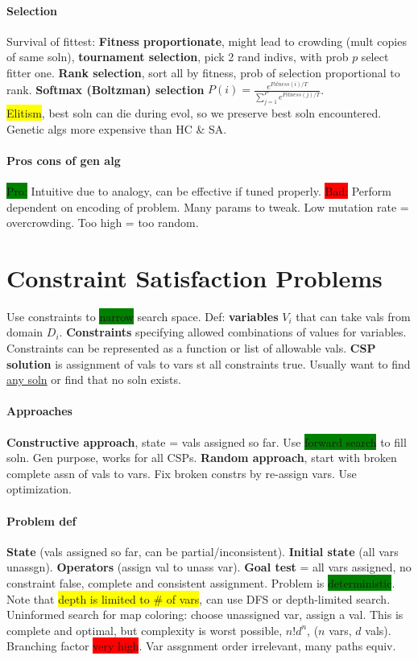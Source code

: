 \paragraph{Selection} Survival of fittest: \textbf{Fitness
  proportionate}, might lead to crowding (mult copies of same soln),
\textbf{tournament selection}, pick 2 rand indivs, with prob $p$
select fitter one. \textbf{Rank selection}, sort all by fitness, prob
of selection proportional to rank. \textbf{Softmax (Boltzman)
  selection}
$P(i)=\frac{e^{Fitness(i)/T}}{\sum_{j=1}^{P}e^{Fitness(j)/T}}$.
\\ \colorbox{yellow}{Elitism}, best soln can die during evol, so we
preserve best soln encountered. Genetic algs more expensive than HC \&
SA.
\paragraph{Pros cons of gen alg} \colorbox{green}{Pro:} Intuitive due to analogy, can be
effective if tuned properly. \colorbox{red}{Bad:} Perform dependent on
encoding of problem. Many params to tweak. Low mutation rate =
overcrowding. Too high = too random.
\color[HTML]{ff7373}
\section{Constraint Satisfaction Problems} Use constraints to
\colorbox{green}{narrow} search space. Def: \textbf{variables} $V_i$
that can take vals from domain $D_i$. \textbf{Constraints} specifying
allowed combinations of values for variables. Constraints can be
represented as a function or list of allowable vals. \textbf{CSP
  solution} is assignment of vals to vars st all constraints
true. Usually want to find \underline{any soln} or find that no soln
exists.
\paragraph{Approaches}
\textbf{Constructive approach}, state = vals assigned so far. Use
\colorbox{green}{forward search} to fill soln. Gen purpose, works for
all CSPs. \textbf{Random approach}, start with broken complete assn of
vals to vars. Fix broken constrs by re-assign vars. Use optimization.
\paragraph{Problem def}\textbf{State} (vals assigned so far, can be
partial/inconsistent). \textbf{Initial state} (all vars
unassgn). \textbf{Operators} (assign val to unass var). \textbf{Goal
  test} = all vars assigned, no constraint false, complete and
consistent assignment. Problem is
\colorbox{green}{deterministic}. Note that \colorbox{yellow}{depth is
  limited to \# of vars}, can use DFS or depth-limited search.
\\ Uninformed search for map coloring: choose unassigned var, assign a
val. This is complete and optimal, but complexity is worst possible,
$n! d^n$, ($n$ vars, $d$ vals). Branching factor \colorbox{red}{very
  high}. Var assgnment order irrelevant, many paths equiv.
